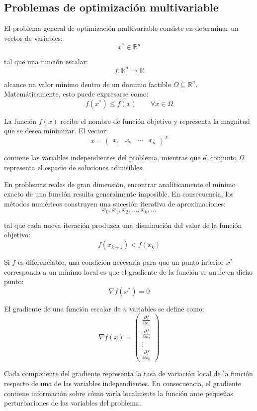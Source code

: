 \subsection{Problemas de optimización multivariable}

El problema general de optimización multivariable consiste en determinar un vector de variables:
\[
x^* \in \mathbb{R}^n
\]

tal que una función escalar:
\[
f : \mathbb{R}^n \rightarrow \mathbb{R}
\]

alcance un valor mínimo dentro de un dominio factible \(\Omega \subseteq \mathbb{R}^n\). Matemáticamente, esto puede expresarse como:
\[
f(x^*) \leq f(x)
\qquad
\forall x \in \Omega
\]

La función \(f(x)\) recibe el nombre de función objetivo y representa la magnitud que se desea minimizar. El vector:
\[
x =
\begin{pmatrix}
x_1 & x_2 & \cdots & x_n
\end{pmatrix}^T
\]

contiene las variables independientes del problema, mientras que el conjunto \(\Omega\) representa el espacio de soluciones admisibles.

En problemas reales de gran dimensión, encontrar analíticamente el mínimo exacto de una función resulta generalmente imposible. En consecuencia, los métodos numéricos construyen una sucesión iterativa de aproximaciones:
\[
x_0, x_1, x_2, \dots , x_k , \dots
\]

tal que cada nueva iteración produzca una disminución del valor de la función objetivo:
\[
f(x_{k+1}) < f(x_k)
\]

Si \(f\) es diferenciable, una condición necesaria para que un punto interior \(x^*\) corresponda a un mínimo local es que el gradiente de la función se anule en dicho punto:
\[
\nabla f(x^*) = 0
\]

El gradiente de una función escalar de \(n\) variables se define como:
\[
\nabla f(x) =
\begin{pmatrix}
\frac{\partial f}{\partial x_1} \\
\frac{\partial f}{\partial x_2} \\
\vdots \\
\frac{\partial f}{\partial x_n}
\end{pmatrix}
\]

Cada componente del gradiente representa la tasa de variación local de la función respecto de una de las variables independientes. En consecuencia, el gradiente contiene información sobre cómo varía localmente la función ante pequeñas perturbaciones de las variables del problema.

